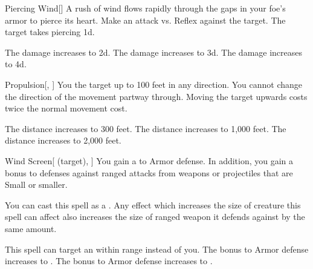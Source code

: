 \lowercase{\hypertarget{spell:Piercing Wind}{}}\label{spell:Piercing Wind}
\begin{freeability}[Rank 2]{\hypertarget{spell:Piercing Wind}{Piercing Wind}}[]
A rush of wind flows rapidly through the gaps in your foe's armor to pierce its heart.
Make an attack vs. Reflex against the target.
\hit The target takes piercing  \plus1d.

\rankline
{} The damage increases to  \plus2d.
 The damage increases to  \plus3d.
 The damage increases to  \plus4d.

\end{freeability}
\vspace{0.25em}



\lowercase{\hypertarget{spell:Propulsion}{}}\label{spell:Propulsion}
\begin{freeability}[Rank 2]{\hypertarget{spell:Propulsion}{Propulsion}}[, ]
You  the target up to 100 feet in any direction.
You cannot change the direction of the movement partway through.
Moving the target upwards costs twice the normal movement cost.

\rankline
{} The distance increases to 300 feet.
 The distance increases to 1,000 feet.
 The distance increases to 2,000 feet.

\end{freeability}
\vspace{0.25em}



\lowercase{\hypertarget{spell:Wind Screen}{}}\label{spell:Wind Screen}
\begin{attuneability}[Rank 2]{\hypertarget{spell:Wind Screen}{Wind Screen}}[ (target), ]
You gain a   to Armor defense.
In addition, you gain a  bonus to defenses against  ranged attacks from weapons or projectiles that are Small or smaller.

You can cast this spell as a .
Any effect which increases the size of creature this spell can affect also increases the size of ranged weapon it defends against by the same amount.

\rankline
{} This spell can target an  within \rngmed range instead of you.
 The bonus to Armor defense increases to .
 The bonus to Armor defense increases to .

\end{attuneability}
\vspace{0.25em}



